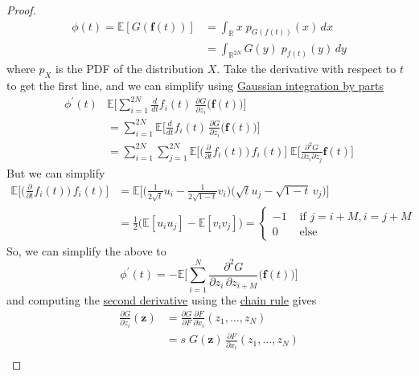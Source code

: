 \begin{proof}
  \begin{align*}
      \phi(t) = \mathbb{E} [G (\mathbf{f}(t))] & = \int_\mathbb{R} x \; p_{G(f(t))} (x) \,dx \\
      & = \int_{\mathbb{R}^{2N}} G(y) \; p_{f(t)} (y) \,dy 
  \end{align*}
  where $p_X$ is the PDF of the distribution $X$. Take the derivative with respect to $t$ to get the first line, and we can simplify using \hyperref[prob-thm:gaussian-ibp]{Gaussian integration by parts} 
  \begin{align*}
      \phi^\prime (t) & \mathbb{E}\bigg[ \sum_{i=1}^{2N} \frac{d}{dt} f_i (t) \; \frac{\partial G}{\partial z_i} \big( \mathbf{f}(t)\big) \bigg] \\
      & = \sum_{i=1}^{2N} \mathbb{E} \bigg[ \frac{d}{dt} f_i (t) \, \frac{\partial G}{\partial z_i} \big( \mathbf{f}(t)\big)\bigg] \\
      & = \sum_{i=1}^{2N} \sum_{j=1}^{2N} \mathbb{E} \bigg[ \Big( \frac{\partial}{\partial t} f_i (t) \Big) \, f_i (t) \bigg] \; \mathbb{E} \bigg[ \frac{\partial^2 G}{\partial z_i \partial z_{j}} \mathbf{f} (t) \bigg] 
  \end{align*}
  But we can simplify 
  \begin{align*}
      \mathbb{E} \bigg[ \Big( \frac{\partial}{\partial t} f_i (t) \Big) \, f_i (t) \bigg] & = \mathbb{E} \bigg[ \Big( \frac{1}{2 \sqrt{t}} u_i - \frac{1}{2 \sqrt{1 - t}} v_i \Big) \big( \sqrt{t} u_j - \sqrt{1 - t} \, v_j \big) \bigg] \\
      & = \frac{1}{2} \big(\mathbb{E}[ u_i u_j] - \mathbb{E}[v_i v_j] \big) = \begin{cases} -1 & \text{ if } j = i + M , i = j + M \\
      0 & \text{ else} \end{cases} 
  \end{align*}
  So, we can simplify the above to
  \begin{equation}
    \phi^\prime (t) = - \mathbb{E} \bigg[  \sum_{i=1}^N \frac{\partial^2 G}{\partial z_i \, \partial z_{i + M}} \big( \mathbf{f}(t)\big) \bigg]
  \end{equation}
  and computing the \hyperref[mv-def:second-derivative]{second derivative} using the \hyperref[mv-thm:chain-rule]{chain rule} gives 
  \begin{align*}
      \frac{\partial G}{\partial z_i} (\mathbf{z}) & = \frac{\partial G}{\partial F} \frac{\partial F}{\partial x_i} (z_1, \ldots, z_N) \\
      & = s \; G(\mathbf{z}) \, \frac{\partial F}{\partial x_i} (z_1, \ldots, z_N) \\

\end{align*}
\end{proof}
